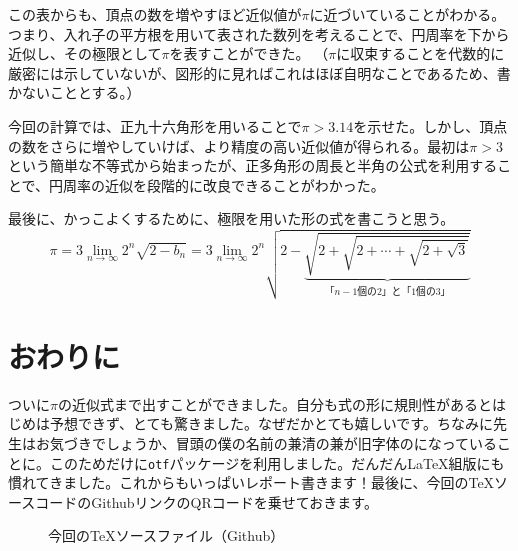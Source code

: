\documentclass[dvipdfmx]{jlreq}
\begin{document}
この表からも、頂点の数を増やすほど近似値が$\pi$に近づいていることがわかる。
つまり、入れ子の平方根を用いて表された数列を考えることで、円周率を下から近似し、その極限として$\pi$を表すことができた。
（$\pi$に収束することを代数的に厳密には示していないが、図形的に見ればこれはほぼ自明なことであるため、書かないこととする。）

今回の計算では、正九十六角形を用いることで$\pi>3.14$を示せた。しかし、頂点の数をさらに増やしていけば、より精度の高い近似値が得られる。最初は$\pi>3$という簡単な不等式から始まったが、正多角形の周長と半角の公式を利用することで、円周率の近似を段階的に改良できることがわかった。

最後に、かっこよくするために、極限を用いた形の式を書こうと思う。
\[
\boxed{
\pi=
3\lim_{n\to\infty}2^n\sqrt{2-b_n}=
3\lim_{n\to\infty}2^n\sqrt{2-\underbrace{\sqrt{2+\sqrt{2+\cdots+\sqrt{2+\sqrt{3}}}}}_{\text{「}n-1\text{個の2」と「1個の3」}}}
}
\]
\section{おわりに}
ついに$\pi$の近似式まで出すことができました。自分も式の形に規則性があるとはじめは予想できず、とても驚きました。なぜだかとても嬉しいです。ちなみに先生はお気づきでしょうか、冒頭の僕の名前の兼清の兼が旧字体のになっていることに。このためだけに\texttt{otf}パッケージを利用しました。だんだん\LaTeX 組版にも慣れてきました。これからもいっぱいレポート書きます！最後に、今回の\TeX ソースコードのGithubリンクのQRコードを乗せておきます。
\begin{figure}[htbp]
  \centering
  \vspace{3cm}
  \caption*{今回の\TeX ソースファイル（Github）}
\end{figure}
\end{document}
